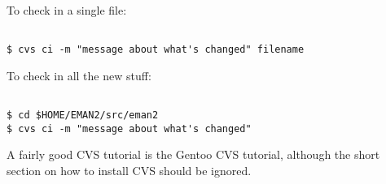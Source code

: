  To check in a single file:
\begin{verbatim}

$ cvs ci -m "message about what's changed" filename

\end{verbatim}


 To check in all the new stuff:
\begin{verbatim}

$ cd $HOME/EMAN2/src/eman2
$ cvs ci -m "message about what's changed"

\end{verbatim}


 A fairly good CVS tutorial is the Gentoo CVS tutorial, although the short section on how to install CVS should be ignored.

%
